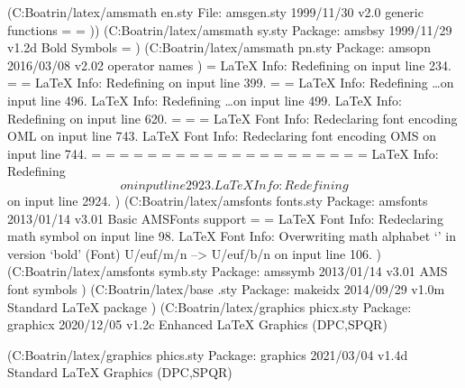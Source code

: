 (C:\Users\Landrine Boatrin\AppData\Local\Programs\MiKTeX\tex/latex/amsmath\amsg
en.sty
File: amsgen.sty 1999/11/30 v2.0 generic functions
\@emptytoks=
\ex@=
))
(C:\Users\Landrine Boatrin\AppData\Local\Programs\MiKTeX\tex/latex/amsmath\amsb
sy.sty
Package: amsbsy 1999/11/29 v1.2d Bold Symbols
\pmbraise@=
)
(C:\Users\Landrine Boatrin\AppData\Local\Programs\MiKTeX\tex/latex/amsmath\amso
pn.sty
Package: amsopn 2016/03/08 v2.02 operator names
)
\inf@bad=
LaTeX Info: Redefining \frac on input line 234.
\uproot@=
\leftroot@=
LaTeX Info: Redefining \overline on input line 399.
\classnum@=
\DOTSCASE@=
LaTeX Info: Redefining \ldots on input line 496.
LaTeX Info: Redefining \dots on input line 499.
LaTeX Info: Redefining \cdots on input line 620.
\Mathstrutbox@=
\strutbox@=
\big@size=
LaTeX Font Info:    Redeclaring font encoding OML on input line 743.
LaTeX Font Info:    Redeclaring font encoding OMS on input line 744.
\macc@depth=
\c@MaxMatrixCols=
\dotsspace@=
\c@parentequation=
\dspbrk@lvl=
\tag@help=
\row@=
\column@=
\maxfields@=
\andhelp@=
\eqnshift@=
\alignsep@=
\tagshift@=
\tagwidth@=
\totwidth@=
\lineht@=
\@envbody=
\multlinegap=
\multlinetaggap=
\mathdisplay@stack=
LaTeX Info: Redefining \[ on input line 2923.
LaTeX Info: Redefining \] on input line 2924.
)
(C:\Users\Landrine Boatrin\AppData\Local\Programs\MiKTeX\tex/latex/amsfonts\ams
fonts.sty
Package: amsfonts 2013/01/14 v3.01 Basic AMSFonts support
\symAMSa=
\symAMSb=
LaTeX Font Info:    Redeclaring math symbol \hbar on input line 98.
LaTeX Font Info:    Overwriting math alphabet `\mathfrak' in version `bold'
(Font)                  U/euf/m/n --> U/euf/b/n on input line 106.
)
(C:\Users\Landrine Boatrin\AppData\Local\Programs\MiKTeX\tex/latex/amsfonts\ams
symb.sty
Package: amssymb 2013/01/14 v3.01 AMS font symbols
)
(C:\Users\Landrine Boatrin\AppData\Local\Programs\MiKTeX\tex/latex/base\makeidx
.sty
Package: makeidx 2014/09/29 v1.0m Standard LaTeX package
)
(C:\Users\Landrine Boatrin\AppData\Local\Programs\MiKTeX\tex/latex/graphics\gra
phicx.sty
Package: graphicx 2020/12/05 v1.2c Enhanced LaTeX Graphics (DPC,SPQR)

(C:\Users\Landrine Boatrin\AppData\Local\Programs\MiKTeX\tex/latex/graphics\gra
phics.sty
Package: graphics 2021/03/04 v1.4d Standard LaTeX Graphics (DPC,SPQR)

